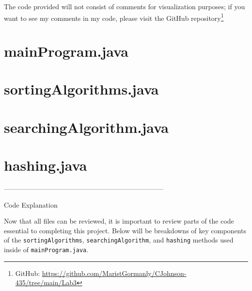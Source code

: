\documentclass{article}
\begin{document}
\begin{footnotesize}
The code provided will not consist of comments for visualization purposes; if you want to see my comments in my code, please visit the GitHub repository\footnote{GitHub: \url{https://github.com/MaristGormanly/CJohnson-435/tree/main/Lab3}} 
\end{footnotesize}

\section {\Large {mainProgram.java}}

   




\section {\Large {sortingAlgorithms.java}}

   





\section {\Large {searchingAlgorithm.java}}

   





\section {\Large {hashing.java}}

   








\begin{center}
    -----------------------------------------------------------------------
\end{center}

\begin{center}
\begin{large}
    Code Explanation
\end{large}
\end{center}

Now that all files can be reviewed, it is important to review parts of the code essential to completing this project. Below will be breakdowns of key components of the \verb|sortingAlgorithms|, \verb|searchingAlgorithm|, and \verb|hashing| methods used inside of \verb|mainProgram.java|.
\end{document}
